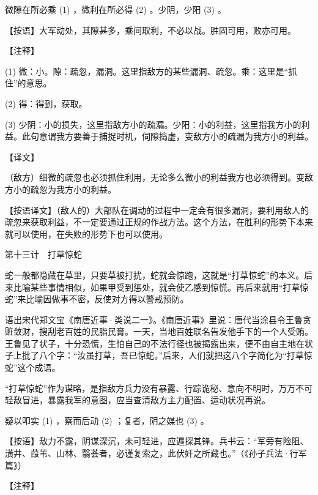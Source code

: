 \documentclass[12pt,UTF8]{ctexbook}
\begin{document}
微隙在所必乘 (1) ，微利在所必得 (2) 。少阴，少阳 (3) 。

【按语】大军动处，其隙甚多，乘间取利，不必以战。胜固可用，败亦可用。





【注释】


(1) 微：小。隙：疏忽，漏洞。这里指敌方的某些漏洞、疏忽。乘：这里是“抓住”的意思。

(2) 得：得到，获取。

(3) 少阴：小的损失，这里指敌方小的疏漏。少阳：小的利益，这里指我方小的利益。此句意谓我方要善于捕捉时机，伺隙捣虚，变敌方小的疏漏为我方小的利益。





【译文】


（敌方）细微的疏忽也必须抓住利用，无论多么微小的利益我方也必须得到。变敌方小的疏忽为我方小的利益。

【按语译文】（敌人的）大部队在调动的过程中一定会有很多漏洞，要利用敌人的疏忽来获取利益，不一定要通过正规的作战方法。这个方法，在胜利的形势下本来就可以使用，在失败的形势下也可以使用。





第十三计　打草惊蛇


蛇一般都隐藏在草里，只要草被打扰，蛇就会惊跑，这就是“打草惊蛇”的本义。后来比喻某些事情相似，如果甲受到惩处，就会使乙感到惊慌。再后来就用“打草惊蛇”来比喻因做事不密，反使对方得以警戒预防。

语出宋代郑文宝《南唐近事·类说二一》。《南唐近事》里说：唐代当涂县令王鲁贪赃敛财，搜刮老百姓的民脂民膏。一天，当地百姓联名告发他手下的一个人受贿。王鲁见了状子，十分恐慌，生怕自己的不法行径也被揭露出来，便不由自主地在状子上批了八个字：“汝虽打草，吾已惊蛇。”后来，人们就把这八个字简化为“打草惊蛇”这个成语。

“打草惊蛇”作为谋略，是指敌方兵力没有暴露、行踪诡秘、意向不明时，万万不可轻敌冒进，暴露我军的意图，应当查清敌方主力配置、运动状况再说。





疑以叩实 (1) ，察而后动 (2) ；复者，阴之媒也 (3) 。

【按语】敌力不露，阴谋深沉，未可轻进，应遍探其锋。兵书云：“军旁有险阻、潢井、葭苇、山林、翳荟者，必谨复索之，此伏奸之所藏也。”（《孙子兵法·行军篇》）





【注释】
\end{document}
